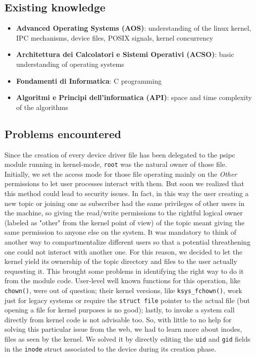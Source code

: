 \documentclass[10pt,a4]{article}
\newcommand{\code}[1]{\texttt{#1}}
\begin{document}
\subsection{Existing knowledge}
\begin{itemize}
  \item \textbf{Advanced Operating Systems (AOS)}: understanding of the linux kernel, IPC mechanisms, device files, POSIX signals, kernel concurrency
  \item \textbf{Architettura dei Calcolatori e Sistemi Operativi (ACSO)}: basic understanding of operating systems
  \item \textbf{Fondamenti di Informatica}: C programming
  \item \textbf{Algoritmi e Principi dell'informatica (API)}: space and time complexity of the algorithms
\end{itemize}

\subsection{Problems encountered}
Since the creation of every device driver file has been delegated to the psipc module running in kernel-mode, \code{root} was the natural owner of those file. Initially, we set the access mode for those file operating mainly on the \textit{Other} permissions to let user processes interact with them. But soon we realized that this method could lead to security issues. In fact, in this way the user creating a new topic or joining one as subscriber had the same privileges of other users in the machine, so giving the read/write permissions to the rightful logical owner (labeled as "other" from the kernel point of view) of the topic meant giving the same permission to anyone else on the system. It was mandatory to think of another way to compartmentalize different users so that a potential threathening one could not interact with another one. For this reason, we decided to let the kernel yield its ownership of the topic directory and files to the user actually requesting it. This brought some problems in identifying the right way to do it from the module code. User-level well known functions for this operation, like \code{chown()}, were out of question; their kernel versions, like \code{ksys\_fchown()}, work just for legacy systems or require the \code{struct file} pointer to the actual file (but opening a file for kernel purposes is no good); lastly, to invoke a system call directly from kernel code is not advisable too. So, with little to no help for solving this particular issue from the web, we had to learn more about inodes, files as seen by the kernel. We solved it by directly editing the \code{uid} and \code{gid} fields in the \code{inode} struct associated to the device during its creation phase.
\end{document}
